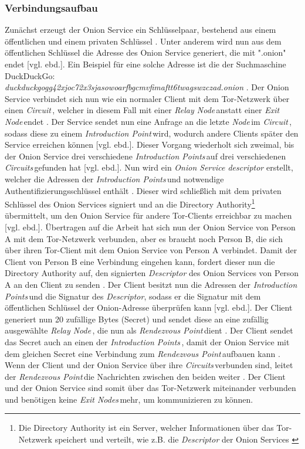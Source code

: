 \documentclass[a4paper,ngerman, headheight=28pt,12pt, footheight=27pt]{scrartcl}
\newcommand{\vcite}[1]{\cite[vgl.][]{#1}}
\newcommand{\vebd}{[vgl. ebd.]}
\newcommand{\relayn}{\textit{Relay Node\,}}
\newcommand{\exitn}{\textit{Exit Node\,}}
\newcommand{\exitns}{\textit{Exit Nodes\,}}
\newcommand{\node}{\textit{Node\,}}
\newcommand{\circuit}{\textit{Circuit\,}}
\newcommand{\circuits}{\textit{Circuits\,}}
\newcommand{\introp}{\textit{Introduction Point\,}}
\newcommand{\introps}{\textit{Introduction Points\,}}
\newcommand{\renp}{\textit{Rendezvous Point\,}}
\begin{document}
\subsubsection{Verbindungsaufbau}
Zunächst erzeugt der Onion Service ein Schlüsselpaar, bestehend aus einem öffentlichen und einem privaten Schlüssel \vcite{GeeksOnionService}. Unter anderem wird nun aus dem öffentlichen Schlüssel die Adresse des Onion Service generiert, die mit ".onion" endet \vebd. Ein Beispiel für eine solche Adresse ist die der Suchmaschine DuckDuckGo: \\
\textit{duckduckgogg42xjoc72x3sjasowoarfbgcmvfimaftt6twagswzczad.onion} \vcite{DuckDuckGoLink}.
Der Onion Service verbindet sich nun wie ein normaler Client mit dem Tor-Netzwerk über einen \circuit, welcher in diesem Fall mit einer \relayn anstatt einer \exitn endet \vcite{TorOnionService}.
Der Service sendet nun eine Anfrage an die letzte \node im \circuit, sodass diese zu einem \introp wird, wodurch andere Clients später den Service erreichen können \vebd. Dieser Vorgang wiederholt sich zweimal, bis der Onion Service drei verschiedene \introps auf drei verschiedenen \circuits gefunden hat \vebd. Nun wird ein \textit{Onion Service descriptor} erstellt, welcher die Adressen der \introps und notwendige Authentifizierungsschlüssel enthält \vcite{TorSpecDirectoryInf, TorSpecDerivingKeys}. Dieser wird schließlich mit dem privaten Schlüssel des Onion Services signiert und an die Directory Authority\footnote{Die Directory Authority ist ein Server, welcher Informationen über das Tor-Netzwerk speichert und verteilt, wie z.B. die \textit{Descriptor} der Onion Services \vcite{TorDirectoryAuthority}} übermittelt, um den Onion Service für andere Tor-Clients erreichbar zu machen \vebd. Übertragen auf die Arbeit hat sich nun der Onion Service von Person A mit dem Tor-Netzwerk verbunden, aber es braucht noch Person B, die sich über ihren Tor-Client mit dem Onion Service von Person A verbindet.
Damit der Client von Person B eine Verbindung eingehen kann, fordert dieser nun die Directory Authority auf, den signierten \textit{Descriptor} des Onion Services von Person A an den Client zu senden \vcite{TorStructure}.
Der Client besitzt nun die Adressen der \introps und die Signatur des \textit{Descriptor}, sodass er die Signatur mit dem öffentlichen Schlüssel der Onion-Adresse überprüfen kann \vebd. Der Client generiert nun 20 zufällige Bytes (Secret) und sendet diese an eine zufällig ausgewählte \relayn, die nun als \renp dient \vcite{TorSpecRendezvous}. Der Client sendet das Secret auch an einen der \introps, damit der Onion Service mit dem gleichen Secret eine Verbindung zum \renp aufbauen kann \vcite{TorSpecIntroP}. Wenn der Client und der Onion Service über ihre \circuits verbunden sind, leitet der \renp die Nachrichten zwischen den beiden weiter \vcite{TorSpecRendezvous}. Der Client und der Onion Service sind somit über das Tor-Netzwerk miteinander verbunden und benötigen keine \exitns mehr, um kommunizieren zu können.
\end{document}
